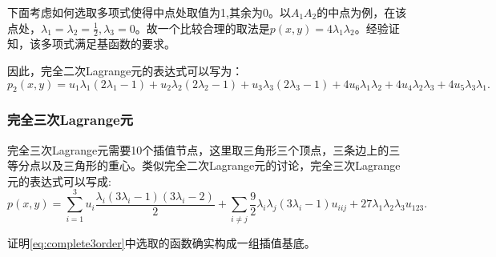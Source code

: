 下面考虑如何选取多项式使得中点处取值为1,其余为0。以$A_{1}A_{2}$的中点为例，在该点处，$\lambda_{1}=\lambda_{2}=\frac{1}{2},\lambda_{3}=0$。故一个比较合理的取法是$p(x,y)=4\lambda_{1}\lambda_{2}$。经验证知，该多项式满足基函数的要求。

因此，完全二次Lagrange元的表达式可以写为：
\begin{equation}
    p_{2}(x,y)=u_{1}\lambda_{1}(2\lambda_{1}-1)+u_{2}\lambda_{2}(2\lambda_{2}-1)+u_{3}\lambda_{3}(2\lambda_{3}-1)+4u_{6}\lambda_{1}\lambda_{2}+4u_{4}\lambda_{2}\lambda_{3}+4u_{5}\lambda_{3}\lambda_{1}.
\end{equation}
\subsubsection{完全三次Lagrange元}
完全三次Lagrange元需要10个插值节点，这里取三角形三个顶点，三条边上的三等分点以及三角形的重心。类似完全二次Lagrange元的讨论，完全三次Lagrange元的表达式可以写成:
\begin{equation}
    \label{eq:complete3order}
    p(x,y)=\sum_{i=1}^{3}u_{i}\frac{\lambda_{i}(3\lambda_{i}-1)(3\lambda_{i}-2)}{2}+\sum_{i\neq j}\frac{9}{2}\lambda_{i}\lambda_{j}(3\lambda_{i}-1)u_{iij}+27\lambda_{1}\lambda_{2}\lambda_{3}u_{123}.
\end{equation}
\begin{exercise}
    证明\eqref{eq:complete3order}中选取的函数确实构成一组插值基底。
\end{exercise}